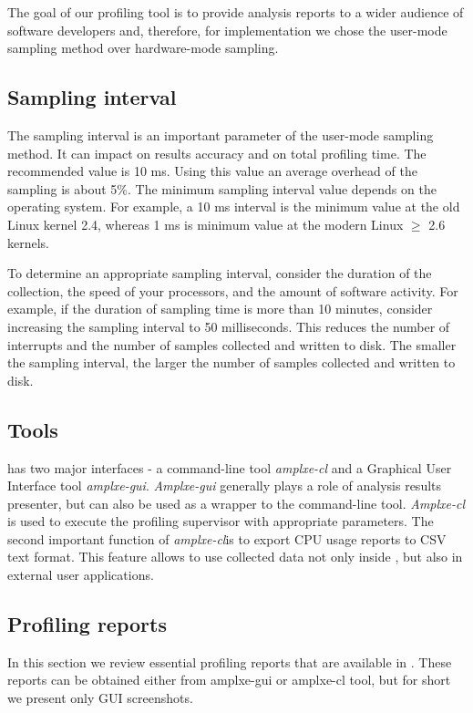 \documentclass[a4paper]{jpconf}
\begin{document}
The goal of our profiling tool is to provide analysis reports to a wider audience of software developers and, therefore, for implementation we chose the user-mode sampling method over hardware-mode sampling.

\subsection{Sampling interval}

The sampling interval is an important parameter of the user-mode sampling method. It can impact on results accuracy and on total profiling time. The recommended value is 10 ms. Using this value an average overhead of the sampling is about 5\%.  The minimum sampling interval value depends on the operating system. For example, a 10 ms interval is the minimum value at the old Linux kernel 2.4, whereas 1 ms is minimum value at the modern Linux $\ge$ 2.6 kernels.

To determine an appropriate sampling interval, consider the duration of the collection, the speed of your processors, and the amount of software activity. For example, if the duration of sampling time is more than 10 minutes, consider increasing the sampling interval to 50 milliseconds. This reduces the number of interrupts and the number of samples collected and written to disk. The smaller the sampling interval, the larger the number of samples collected and written to disk.

\subsection{Tools}

\amp has two major interfaces - a command-line tool {\it amplxe-cl} and a Graphical User Interface tool {\it amplxe-gui}. {\it Amplxe-gui} generally plays a role of analysis results presenter, but can also be used as a wrapper to the  command-line tool. {\it Amplxe-cl} is used to execute the profiling supervisor with appropriate parameters.  The second important function of {\it amplxe-cl}is to export CPU usage reports to CSV text format. This feature allows to use collected data not only inside \amp, but also in external user applications. 

\subsection{Profiling reports}

In this section we review essential profiling reports that are available in \amp. These reports can be obtained either from amplxe-gui or amplxe-cl tool, but for short we present only GUI screenshots.
\end{document}
